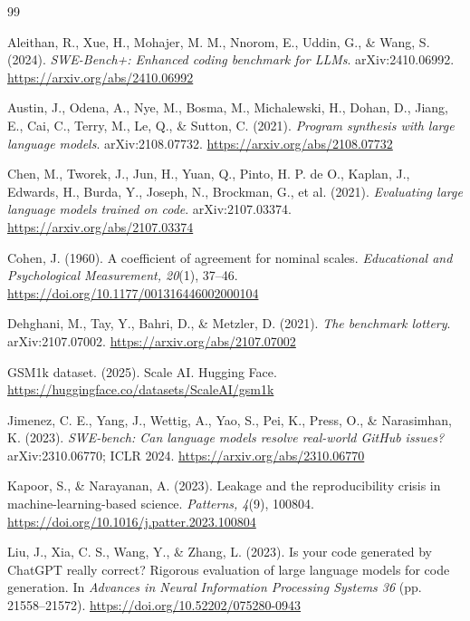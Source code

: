 \documentclass[11pt,a4paper]{article}
\begin{document}
\clearpage
{}
{}
\begin{thebibliography}{99}
\setlength{\bibhang}{1.6em}
\setlength{\bibsep}{0.4em}
\small
\raggedright

Aleithan, R., Xue, H., Mohajer, M. M., Nnorom, E., Uddin, G., \& Wang, S. (2024). \emph{SWE-Bench+: Enhanced coding benchmark for LLMs}. arXiv:2410.06992. \url{https://arxiv.org/abs/2410.06992}

Austin, J., Odena, A., Nye, M., Bosma, M., Michalewski, H., Dohan, D., Jiang, E., Cai, C., Terry, M., Le, Q., \& Sutton, C. (2021). \emph{Program synthesis with large language models}. arXiv:2108.07732. \url{https://arxiv.org/abs/2108.07732}

Chen, M., Tworek, J., Jun, H., Yuan, Q., Pinto, H. P. de O., Kaplan, J., Edwards, H., Burda, Y., Joseph, N., Brockman, G., et al. (2021). \emph{Evaluating large language models trained on code}. arXiv:2107.03374. \url{https://arxiv.org/abs/2107.03374}

Cohen, J. (1960). A coefficient of agreement for nominal scales. \emph{Educational and Psychological Measurement, 20}(1), 37--46. \url{https://doi.org/10.1177/001316446002000104}

Dehghani, M., Tay, Y., Bahri, D., \& Metzler, D. (2021). \emph{The benchmark lottery}. arXiv:2107.07002. \url{https://arxiv.org/abs/2107.07002}

GSM1k dataset. (2025). Scale AI. Hugging Face. \url{https://huggingface.co/datasets/ScaleAI/gsm1k}

Jimenez, C. E., Yang, J., Wettig, A., Yao, S., Pei, K., Press, O., \& Narasimhan, K. (2023). \emph{SWE-bench: Can language models resolve real-world GitHub issues?} arXiv:2310.06770; ICLR 2024. \url{https://arxiv.org/abs/2310.06770}

Kapoor, S., \& Narayanan, A. (2023). Leakage and the reproducibility crisis in machine-learning-based science. \emph{Patterns, 4}(9), 100804. \url{https://doi.org/10.1016/j.patter.2023.100804}

Liu, J., Xia, C. S., Wang, Y., \& Zhang, L. (2023). Is your code generated by ChatGPT really correct? Rigorous evaluation of large language models for code generation. In \emph{Advances in Neural Information Processing Systems 36} (pp. 21558--21572). \url{https://doi.org/10.52202/075280-0943}


\end{thebibliography}
\end{document}
